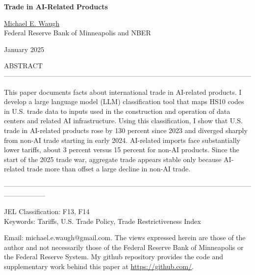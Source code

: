 \documentclass[12pt,pdftex]{article}
\begin{document}
\begin{onehalfspacing}

{\large \textbf{Trade in AI-Related Products}}

\vspace{0.5cm}

\href{http://www.waugheconomics.com/}{Michael E. Waugh} \\ Federal Reserve Bank of Minneapolis and NBER

\vspace{0.5cm}

January 2025

\vspace{0.5cm}



\vspace{1.5cm}


\normalsize

ABSTRACT ------------------------------------------------------------------------------------------------------------

This paper documents facts about international trade in AI-related products. I develop a large language model (LLM) classification tool that maps HS10 codes in U.S. trade data to inputs used in the construction and operation of data centers and related AI infrastructure. Using this classification, I show that U.S. trade in AI-related products rose by 130 percent since 2023 and diverged sharply from non-AI trade starting in early 2024. AI-related imports face substantially lower tariffs, about 3 percent versus 15 percent for non-AI products. Since the start of the 2025 trade war, aggregate trade appears stable only because AI-related trade more than offset a large decline in non-AI trade.

------------------------------------------------------------------------------------------------------------------------------
\vspace{0.25cm}

JEL Classification: F13, F14\\
Keywords: Tariffs, U.S. Trade Policy, Trade Restrictiveness Index


\vspace{4.0cm}

{\footnotesize Email: michael.e.waugh@gmail.com. The views expressed herein are those of the author and not necessarily those of the Federal Reserve Bank of Minneapolis or the Federal Reserve System. My github repository provides the code and supplementary work behind this paper at \url{https://github.com/}.}


\end{onehalfspacing}
\end{document}
